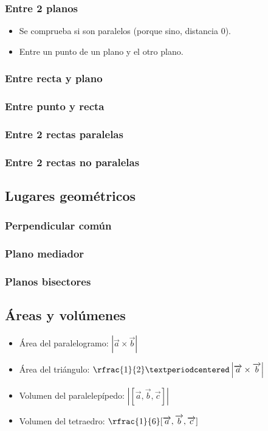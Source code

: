 \subsubsection{Entre 2 planos}

\begin{itemize}
  \item Se comprueba si son paralelos (porque sino, distancia 0).
  \item Entre un punto de un plano y el otro plano.
\end{itemize}


\subsubsection{Entre recta y plano}
\subsubsection{Entre punto y recta}
\subsubsection{Entre 2 rectas paralelas}
\subsubsection{Entre 2 rectas no paralelas}

\subsection{Lugares geométricos}
\subsubsection{Perpendicular común}
\subsubsection{Plano mediador}
\subsubsection{Planos bisectores}

\subsection{Áreas y volúmenes}
\begin{itemize}
  \item Área del paralelogramo: $\left|\vec{a}\times\vec{b}\right|$
  \item Área del triángulo: $\rfrac{1}{2}·\left|\vec{a}\times\vec{b}\right|$
  \item Volumen del paralelepípedo: $\left|[\vec{a},\vec{b},\vec{c}]\right|$
  \item Volumen del tetraedro: $\rfrac{1}{6}[\vec{a},\vec{b},\vec{c}]$
\end{itemize}
